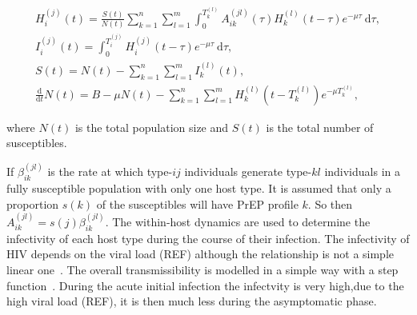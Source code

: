 \documentclass[DIV=15]{scrartcl}
\begin{document}

\begin{gather*}
H^{(j)}_{i}(t) = \frac{S(t)}{N(t)}  \sum_{k=1}^n \sum_{l=1}^m  \int_0^{T^{(l)}_{k}} A^{(jl)}_{ik}(\tau) H^{(l)}_{k}(t-\tau)e^{-\mu \tau} \ \text{d}\tau, \\
I_i^{(j)}(t) = \int_0^{T_i^{(j)}}  H_i^{(j)}(t-\tau)e^{-\mu \tau} \  \text{d}\tau, \\
S(t) = N(t) -  \sum_{k=1}^n \sum_{l=1}^m  I^{(l)}_k(t), \\
\frac{\text{d}}{\text{d} t}  N(t) = B- \mu N(t) -\sum_{k=1}^n \sum_{l=1}^m  H_k^{(l)}(t-T_k^{(l)})e^{-\mu T_k^{(l)}} ,
\end{gather*}

where $N(t)$ is the total population size and $S(t)$ is the total number of susceptibles.

If $\beta_{ik}^{(jl)} $ is the rate at which  type-$ij$ individuals generate  type-$kl$ individuals in a fully susceptible population with only one host type. It is assumed that only a proportion $s(k)$ of the susceptibles will have PrEP profile $k$. So then $A_{ik}^{(jl)} 
= s(j) \beta_{ik}^{(jl)} $.  The within-host dynamics are used to determine the infectivity of each host type during the course of their infection. The infectivity of HIV depends on the viral load (REF) although the relationship is not a simple  linear one~\cite{fraser2007}. The overall transmissibility is  modelled  in a simple way with a step function~\cite{hollingsworth2008}. During the acute initial infection the infectvity is very high,due to the high viral load (REF), it is then much less during the asymptomatic phase.
\end{document}
